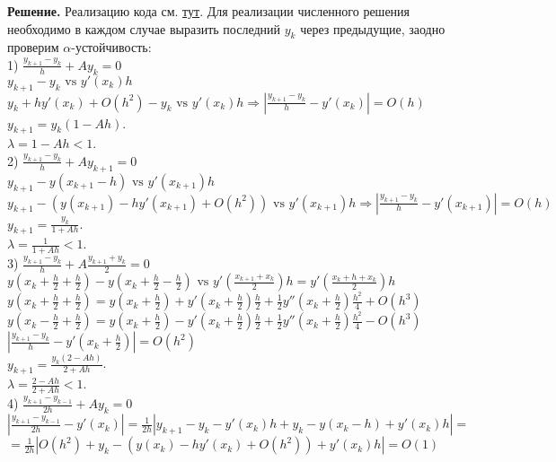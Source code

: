 \documentclass[14pt,a4paper]{extarticle}
\newcommand{\1}{\mathbbm{1}}
\begin{document}
\textbf{Решение.} 
Реализацию кода см. \href{https://github.com/VsevolodZaostrovsky/NumericalMethods/tree/main/Differential%20Equations/Code/src}{тут}. 
Для реализации численного решения необходимо в каждом случае выразить последний $y_k$ через предыдущие, заодно проверим 
$\alpha$-устойчивость: \\
1) $\frac{y_{k+1}-y_k}{h}+A y_k=0 $\\ 
$y_{k+1}-y_k \text{ vs } y'(x_k) h $\\ 
$y_{k} + h y'(x_k) + O(h^2) - y_k \text{ vs } y'(x_k) h \Rightarrow {|\frac{y_{k+1}-y_k}{h} - y'(x_k)| = O(h)}$ \\ 
$y_{k+1} = y_k (1 - Ah)$. \\
$\lambda = 1 - A h < 1$. \\
2) $\frac{y_{k+1}-y_k}{h}+A y_{k+1}=0$ \\ 
$y_{k+1}-y(x_{k+1} - h) \text{ vs } y'(x_{k+1}) h $\\ 
$y_{k+1} -( y(x_{k+1}) - h y'(x_{k+1}) + O(h^2)) \text{ vs } y'(x_{k+1}) h \Rightarrow {|\frac{y_{k+1}-y_k}{h} - y'(x_{k+1})| = O(h)}$ \\ 
$y_{k+1} = \frac{y_k}{1 + Ah} $.\\
$\lambda = \frac{1}{1 + Ah} < 1$. \\
3) $\frac{y_{k+1}-y_k}{h}+A \frac{y_{k+1}+y_k}{2}=0 $\\ 
$y(x_k + \frac{h}{2} + \frac{h}{2}) - y(x_k + \frac{h}{2} - \frac{h}{2}) \text{ vs } y'(\frac{x_{k+1} + x_k}{2}) h = y'(\frac{x_{k} + h + x_k}{2}) h$\\ 
$y(x_k + \frac{h}{2} + \frac{h}{2}) = y(x_k + \frac{h}{2}) + y'(x_k + \frac{h}{2}) \frac{h}{2} + \frac{1}{2} y''(x_k + \frac{h}{2}) \frac{h^2}{4} + O(h^3)$\\
$y(x_k - \frac{h}{2} + \frac{h}{2}) = y(x_k + \frac{h}{2}) - y'(x_k + \frac{h}{2}) \frac{h}{2} + \frac{1}{2} y''(x_k + \frac{h}{2}) \frac{h^2}{4} - O(h^3)$\\ 
$|\frac{y_{k+1}-y_k}{h} - y'(x_k + \frac{h}{2})| = O(h^2)$\\ 
$y_{k+1} = \frac{y_k (2 - A h)}{2 + Ah} $. \\
$\lambda = \frac{2 - A h}{2+ A h} < 1$. \\
4) $\frac{y_{k+1}-y_{k-1}}{2 h}+A y_k=0$ \\
$|\frac{y_{k+1}-y_{k-1}}{2h} - y'(x_k)| = \frac{1}{2 h} |y_{k+1} - y_k - y'(x_k) h + y_k - y(x_{k} - h) + y'(x_k) h| =$\\
$= \frac{1}{2 h} |O(h^2) + y_k - (y(x_k) - h y'(x_k) + O(h^2)) + y'(x_k) h| = O(1)$ \\
\end{document}
